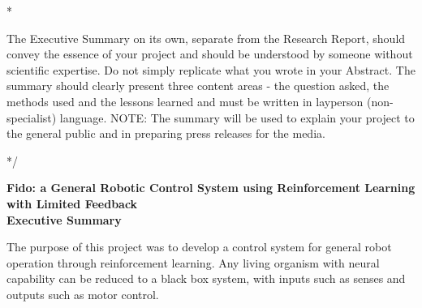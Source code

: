\documentclass[letterpaper,12pt]{article}
\begin{document}
\/*

The Executive Summary on its own, separate from the Research Report, should convey the essence of your project and should be understood by someone without scientific expertise. Do not simply replicate what you wrote in your Abstract. The summary should clearly present three content areas - the question asked, the methods used and the lessons learned and must be written in layperson (non-specialist) language. NOTE: The summary will be used to explain your project to the general public and in preparing press releases for the media.

*/

\begin{center}
	{\Large
	\textbf{Fido: a General Robotic Control System using Reinforcement Learning with Limited Feedback}}\\
	\vspace{1cm}
	{\large \textbf{Executive Summary}}
\end{center}

\noindent

The purpose of this project was to develop a control system for general robot operation through reinforcement learning.   Any living organism with neural capability can be reduced to a black box system, with inputs such as senses and outputs such as motor control.
\end{document}
